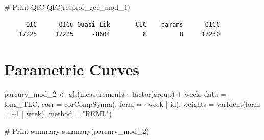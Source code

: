 \documentclass[
  letterpaper,
  DIV=11,
  numbers=noendperiod]{scrreprt}
\newenvironment{Shaded}{\begin{snugshade}}{\end{snugshade}}
\newcommand{\AttributeTok}[1]{\textcolor[rgb]{0.40,0.45,0.13}{#1}}
\newcommand{\CommentTok}[1]{\textcolor[rgb]{0.37,0.37,0.37}{#1}}
\newcommand{\DecValTok}[1]{\textcolor[rgb]{0.68,0.00,0.00}{#1}}
\newcommand{\FunctionTok}[1]{\textcolor[rgb]{0.28,0.35,0.67}{#1}}
\newcommand{\NormalTok}[1]{\textcolor[rgb]{0.00,0.23,0.31}{#1}}
\newcommand{\OtherTok}[1]{\textcolor[rgb]{0.00,0.23,0.31}{#1}}
\newcommand{\SpecialCharTok}[1]{\textcolor[rgb]{0.37,0.37,0.37}{#1}}
\newcommand{\StringTok}[1]{\textcolor[rgb]{0.13,0.47,0.30}{#1}}
\begin{document}
\begin{Shaded}
\begin{Highlighting}[]
\CommentTok{\# Print QIC}
\FunctionTok{QIC}\NormalTok{(resprof\_gee\_mod\_1)}
\end{Highlighting}
\end{Shaded}

\begin{verbatim}
      QIC      QICu Quasi Lik       CIC    params      QICC 
    17225     17225     -8604         8         8     17230 
\end{verbatim}

\hypertarget{parametric-curves}{%
\section{Parametric Curves}\label{parametric-curves}}

\begin{Shaded}
\end{Shaded}

\begin{Shaded}
\begin{Highlighting}[]
\NormalTok{parcurv\_mod\_2 }\OtherTok{\textless{}{-}} \FunctionTok{gls}\NormalTok{(measurements }\SpecialCharTok{\textasciitilde{}} \FunctionTok{factor}\NormalTok{(group) }\SpecialCharTok{+}\NormalTok{ week, }\AttributeTok{data =}\NormalTok{ long\_TLC, }\AttributeTok{corr =} \FunctionTok{corCompSymm}\NormalTok{(,}
    \AttributeTok{form =} \SpecialCharTok{\textasciitilde{}}\NormalTok{week }\SpecialCharTok{|}\NormalTok{ id), }\AttributeTok{weights =} \FunctionTok{varIdent}\NormalTok{(}\AttributeTok{form =} \SpecialCharTok{\textasciitilde{}}\DecValTok{1} \SpecialCharTok{|}\NormalTok{ week), }\AttributeTok{method =} \StringTok{"REML"}\NormalTok{)}

\CommentTok{\# Print summary}
\FunctionTok{summary}\NormalTok{(parcurv\_mod\_2)}
\end{Highlighting}
\end{Shaded}
\end{document}
